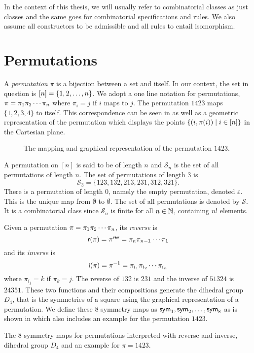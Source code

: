 In the context of this thesis, we will usually refer to combinatorial classes as just classes and the same goes for combinatorial specifications and rules. We also assume all constructors to be admissible and all rules to entail isomorphism. 

\section{Permutations\label{sec:permutations}}
A \emph{permutation} $\pi$ is a bijection between a set and itself. In our context, the set in question is $[n] = \left\{1,2,\dotsc,n\right\}$. We adopt a one line notation for permutations, $\pi = \pi_1 \pi_2 \dotsm \pi_{n}$ where $\pi_i = j$ if $i$ maps to $j$. The permutation $1423$ maps $\{1,2,3,4\}$ to itself. This correspondence can be seen in  as well as a geometric representation of the permutation which displays the points $\left\{(i,\pi(i)) \mid i \in [n]\right\}$ in the Cartesian plane.

\begin{figure}[ht!]
    \centering
    
    \caption{The mapping and graphical representation of the permutation $1423$.}
    \label{fig:perm_example}
\end{figure}

A permutation on $[n]$ is said to be of length $n$ and $\mathcal{S}_n$ is the set of all permutations of length $n$. The set of permutations of length 3 is 
\[
    \mathcal{S}_3 = \{123,132,213,231,312,321\}.
\]
There is a permutation of length $0$, namely the empty permutation, denoted $\varepsilon$. This is the unique map from $\emptyset$ to $\emptyset$. The set of all permutations is denoted by $\mathcal{S}$. It is a combinatorial class since $\mathcal{S}_n$ is finite for all $n\in\mathbb{N}$, containing $n!$ elements.

Given a permutation $\pi = \pi_1 \pi_2 \dotsm \pi_{n}$, its \emph{reverse} is
\[
    \textsf{r}(\pi) = \pi^\textsf{rev} = \pi_{n} \pi_{n - 1} \dotsm \pi_1
\]
and its \emph{inverse} is
\[
    \textsf{i}(\pi) = \pi^{-1} = \pi_{i_1} \pi_{i_2} \dotsm \pi_{i_{n}}
\]
where $\pi_{i_j} = k$ if $\pi_k = j$. The reverse of $132$ is $231$ and the inverse of $51324$ is $24351$. These two functions and their compositions generate the dihedral group $D_4$, that is the symmetries of a square using the graphical representation of a permutation. We define these 8 symmetry maps as $\textsf{sym}_1,\textsf{sym}_2,\dotsc,\textsf{sym}_8$ as is shown in  which also includes an example for the permutation $1423$.

\begin{table}[ht!]
    \centering
    
    \caption{The 8 symmetry maps for permutations interpreted with reverse and inverse, dihedral group $D_4$ and an example for $\pi=1423$.}
    \label{tab:permsym}
\end{table}

